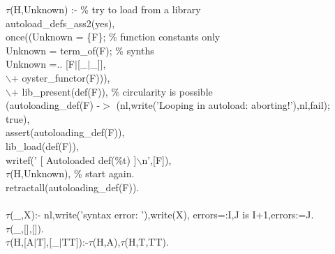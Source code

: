 \documentclass[11pt]{report}
\begin{document}
\begin{sf}
\begin{tabbing}
$\tau$(H,Unknown) :-				\% try to load from a library\\[-0.15ex]
\hspace{2em}autoload\_\hspace{0.1em}defs\_\hspace{0.1em}ass2(yes),\\[-0.15ex]
\hspace{2em}once((Unknown = \{F\};			\% function constants only\\[-0.15ex]
	  Unknown = term\_\hspace{0.1em}of(F);			\% synths\\[-0.15ex]
	  Unknown =.. [F$\mid$[\_\hspace{0.1em}$\mid$\_\hspace{0.1em}]],\\[-0.15ex]
	  $\backslash$+ oyster\_\hspace{0.1em}functor(F))),\\[-0.15ex]
\hspace{2em}$\backslash$+ lib\_\hspace{0.1em}present(def(F)),			\% circularity is possible\\[-0.15ex]
\hspace{2em}(autoloading\_\hspace{0.1em}def(F) -$>$ (nl,write('Looping in autoload: aborting!'),nl,fail);\\[-0.15ex]
\hspace{2em}true),\\[-0.15ex]
\hspace{2em}assert(autoloading\_\hspace{0.1em}def(F)),\\[-0.15ex]
\hspace{2em}lib\_\hspace{0.1em}load(def(F)),\\[-0.15ex]
\hspace{2em}writef('  [ Autoloaded def(\%t) ]$\backslash$n',[F]),\\[-0.15ex]
\hspace{2em}$\tau$(H,Unknown),				\% start again.    \\[-0.15ex]
\hspace{2em}retractall(autoloading\_\hspace{0.1em}def(F)).\\[-0.15ex]
\hspace{2em}\\[-0.15ex]
$\tau$(\_\hspace{0.1em},X):- nl,write('syntax error: '),write(X), errors=:I,J is I+1,errors:=J.\\[-0.15ex]
$\tau$(\_\hspace{0.1em},[],[]).\\[-0.15ex]
$\tau$(H,[A$\mid$T],[\_\hspace{0.1em}$\mid$TT]):-$\tau$(H,A),$\tau$(H,T,TT).\\[-0.7ex]

\end{tabbing}\end{sf}
\end{document}
